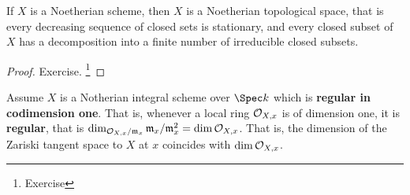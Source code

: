 \begin{proposition}
If $ X $ is a Noetherian scheme, then $ X $ is a Noetherian topological space, that is every decreasing sequence of closed sets is stationary, and every closed subset of $ X $ has a decomposition into a finite number of irreducible closed subsets.
\end{proposition}

\begin{proof}
Exercise. \footnote{Exercise}
\end{proof}

Assume $ X $ is a Notherian integral scheme over $ \Spec k $ which is \textbf{regular in codimension one}. That is, whenever a local ring $ \mathcal{O}_{X, x} $ is of dimension one, it is \textbf{regular}, that is $ \dim_{\mathcal{O}_{X, x} / \mathfrak{m}_x} \mathfrak{m}_x / \mathfrak{m}_x^2 = \dim \mathcal{O}_{X, x} $. That is, the dimension of the Zariski tangent space to $ X $ at $ x $ coincides with $ \dim \mathcal{O}_{X, x} $.

